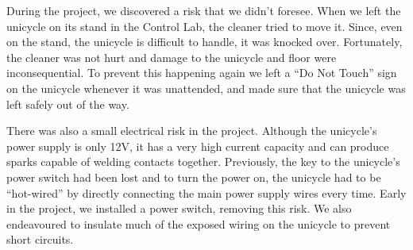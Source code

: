 \documentclass{IIBproject}
\begin{document}
During the project, we discovered a risk that we didn't foresee. When we left
the unicycle on its stand in the Control Lab, the cleaner tried to move it.
Since, even on the stand, the unicycle is difficult to handle, it was knocked
over. Fortunately, the cleaner was not hurt and damage to the unicycle and
floor were inconsequential. To prevent this happening again we left a ``Do
Not Touch'' sign on the unicycle whenever it was unattended, and made sure
that the unicycle was left safely out of the way.

There was also a small electrical risk in the project. Although the unicycle's
power supply is only 12V, it has a very high current capacity and can
produce sparks capable of welding contacts together. Previously, the key to
the unicycle's power switch had been lost and to turn the power on, the
unicycle had to be ``hot-wired'' by directly connecting the main power supply
wires every time. Early in the project, we installed a power switch, removing
this risk. We also endeavoured to insulate much of the exposed wiring on the
unicycle to prevent short circuits.
\end{document}

